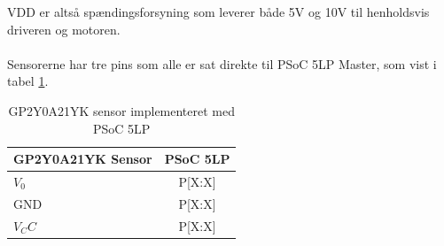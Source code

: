 \noindent
VDD er altså spændingsforsyning som leverer både 5V og 10V til henholdsvis driveren og motoren.
\\
\\
Sensorerne har tre pins som alle er sat direkte til PSoC 5LP Master, som vist i tabel \ref{tab:Sensor_pin_konfigurering}.

\begin{table}[H]
  \centering
\begin{tabular}{ |l|c| }
  \hline
  \textbf{GP2Y0A21YK Sensor} & \textbf{PSoC 5LP}\\
  \hline 
  $V_0$ & P[X:X] \\
  \hline 
  GND & P[X:X] \\
  \hline 
  $V_CC$ & P[X:X] \\
  \hline 
\end{tabular}
\caption{GP2Y0A21YK sensor implementeret med PSoC 5LP}\label{tab:Sensor_pin_konfigurering}
\end{table}